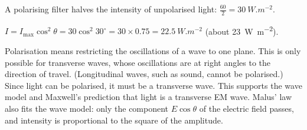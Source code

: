 \documentclass[12pt]{article}
\begin{document}
\ansq
{}
\begin{crit}
\end{crit}
\sample
A polarising filter halves the intensity of unpolarised light: $\frac{60}{2} = \qty{30}{W.m^{-2}}$.
\begin{crit}
\end{crit}
\sample
$I = I_\mathrm{max}\cos^2\theta = 30\cos^2 30^\circ = 30 \times 0.75 = \qty{22.5}{W.m^{-2}}$ (about
\qty{23}{W.m^{-2}}).
\begin{crit}
\end{crit}
\sample
Polarisation means restricting the oscillations of a wave to one plane. This is only possible for
transverse waves, whose oscillations are at right angles to the direction of travel. (Longitudinal waves,
such as sound, cannot be polarised.) Since light can be polarised, it must be a transverse wave. This
supports the wave model and Maxwell's prediction that light is a transverse EM wave. Malus' law also fits
the wave model: only the component $E\cos\theta$ of the electric field passes, and intensity is
proportional to the square of the amplitude.
\end{document}
